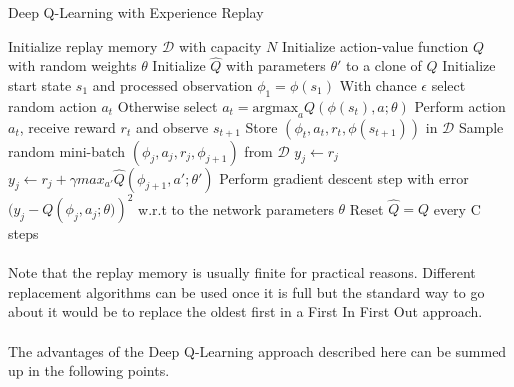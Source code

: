 \begin{algorithm}
  \caption{Deep Q-Learning with Experience Replay}
\label{algo:deep_q_learning}
\begin{algorithmic}
  \State Initialize replay memory $\mathcal{D}$ with capacity $N$
  \State Initialize action-value function $Q$ with random weights $\theta$
  \State Initialize $\hat{Q}$ with parameters $\theta'$ to a clone of $Q$
    \State Initialize start state $s_1$ and processed observation $\phi_1 = \phi(s_1)$
      \State With chance $\epsilon$ select random action $a_t$
      \State Otherwise select $a_t = \text{argmax}_a Q(\phi(s_t), a; \theta)$
      \State Perform action $a_t$, receive reward $r_t$ and observe $s_{t+1}$
      \State Store $(\phi_t, a_t, r_t, \phi(s_{t+1}))$ in $\mathcal{D}$
      \State Sample random mini-batch $(\phi_j, a_j, r_j, \phi_{j+1})$ from $\mathcal{D}$
        \State $y_j \gets r_j$
      \Else
      \State $y_j \gets r_j + \gamma max_{a'} \hat{Q}(\phi_{j+1}, a';\theta')$
      \EndIf
      \State Perform gradient descent step with error
      $(y_j-Q\left(\phi_j,a_j;\theta)\right)^2$
      w.r.t to the network parameters $\theta$
      \State Reset $\hat{Q} = Q$ every C steps
    \EndFor
  \EndFor
\end{algorithmic}
\end{algorithm}

\paragraph{}
Note that the replay memory is usually finite for practical reasons.
Different replacement algorithms can be used once it is full
but the standard way to go about it
would be to replace the oldest first
in a First In First Out approach.

\paragraph{}
The advantages of the Deep Q-Learning approach described here
can be summed up in the following points.

